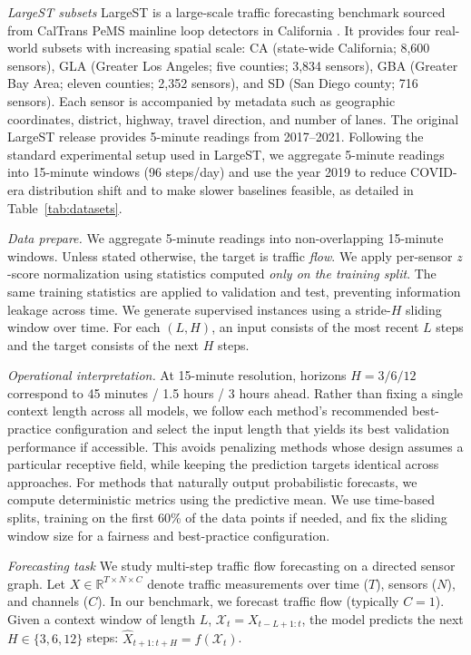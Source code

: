 \documentclass[10pt]{article}
\begin{document}
\textit{LargeST subsets}
LargeST is a large-scale traffic forecasting benchmark sourced from CalTrans PeMS mainline loop
detectors in California \cite{liu2023largest}. It provides four real-world subsets with increasing spatial
scale: {CA} (state-wide California; 8,600 sensors), {GLA} (Greater Los Angeles; five counties; 3,834 sensors),
{GBA} (Greater Bay Area; eleven counties; 2,352 sensors), and {SD} (San Diego county; 716 sensors). Each sensor is
accompanied by metadata such as geographic coordinates, district, highway, travel direction, and number
of lanes.
The original LargeST release provides 5-minute readings from 2017--2021. Following
the standard experimental setup used in LargeST, we aggregate 5-minute readings into {15-minute}
windows (96 steps/day) and use {the year 2019} to reduce COVID-era distribution shift and to make
slower baselines feasible, as detailed in Table~\ref{tab:datasets}. 


\textit{Data prepare.}
We aggregate 5-minute readings into non-overlapping 15-minute windows. Unless stated otherwise, the
target is traffic \emph{flow}. We apply per-sensor $z$-score normalization using statistics computed \emph{only on the training split}.
The same training statistics are applied to validation and test, preventing information leakage across
time. We generate supervised instances using a stride-$H$ sliding window over time. For each $(L,H)$, an input
consists of the most recent $L$ steps and the target consists of the next $H$ steps.




\textit{Operational interpretation.}
At 15-minute resolution, horizons $H=3/6/12$ correspond to 45 minutes / 1.5 hours / 3 hours
ahead. Rather than fixing a single context length across all models, we follow each method's recommended best-practice configuration and select the input length that yields its best validation performance if accessible. This avoids penalizing methods whose design assumes a particular receptive field, while keeping the prediction targets identical across approaches. For methods that naturally output probabilistic forecasts, we compute deterministic metrics using the predictive mean. We use time-based splits, training on the first 60\% of the data points if needed, and fix the sliding window size for a fairness and best-practice configuration.


\textit{Forecasting task}
We study multi-step traffic flow forecasting on a directed sensor graph. Let
$X \in \mathbb{R}^{T \times N \times C}$ denote traffic measurements over time ($T$), sensors ($N$), and
channels ($C$). In our benchmark, we forecast {traffic flow} (typically $C=1$).
Given a context window of length $L$,
$\mathcal{X}_{t} = X_{t-L+1:t}$, the model predicts the next $H \in \{3, 6, 12\}$ steps:
$\hat{X}_{t+1:t+H} = f(\mathcal{X}_{t})$.
\end{document}
